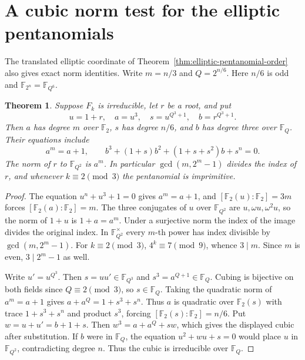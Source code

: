 \documentclass[11pt]{article}
\newtheorem{theorem}{Theorem}
\newcommand{\F}{\mathbb F_2}
\begin{document}
\section{A cubic norm test for the elliptic pentanomials}
\label{sec:elliptic-cubic-norm}
The translated elliptic coordinate of Theorem~\ref{thm:elliptic-pentanomial-order}
also gives exact norm identities. Write \(m=n/3\) and \(Q=2^{n/6}\).
Here \(n/6\) is odd and \(\mathbb F_{2^n}=\mathbb F_{Q^6}\).
\begin{theorem}\label{thm:elliptic-cubic-norm}
Suppose \(F_k\) is irreducible, let \(r\) be a root, and put
\[
 u=1+r,\quad a=u^3,\quad s=u^{Q^3+1},\quad b=r^{Q^3+1}.
\]
Then \(a\) has degree \(m\) over \(\F\), \(s\) has degree \(n/6\),
and \(b\) has degree three over \(\mathbb F_Q\). Their equations include
\[
 a^m=a+1,\qquad
 b^3+(1+s)b^2+(1+s+s^2)b+s^n=0.
\]
The norm of \(r\) to \(\mathbb F_{Q^2}\) is \(a^m\). In particular
\(\gcd(m,2^m-1)\) divides the index of \(r\), and whenever
\(k\equiv2\pmod3\) the pentanomial is imprimitive.
\end{theorem}
\begin{proof}
The equation \(u^n+u^3+1=0\) gives \(a^m=a+1\), and
\([\F(u):\F]=3m\) forces \([\F(a):\F]=m\).
The three conjugates of \(u\) over \(\mathbb F_{Q^2}\) are
\(u,\omega u,\omega^2u\), so the norm of \(1+u\) is \(1+a=a^m\).
Under a surjective norm the index of the image divides the original
index. In \(\mathbb F_{Q^2}^\times\) every \(m\)-th power has index
divisible by \(\gcd(m,2^m-1)\). For \(k\equiv2\pmod3\),
\(4^k\equiv7\pmod9\), whence \(3\mid m\). Since \(m\) is even,
\(3\mid 2^m-1\) as well.

Write \(u'=u^{Q^3}\). Then \(s=uu'\in\mathbb F_{Q^3}\) and
\(s^3=a^{Q+1}\in\mathbb F_Q\). Cubing is bijective on both fields
since \(Q\equiv2\pmod3\), so \(s\in\mathbb F_Q\).
Taking the quadratic norm of \(a^m=a+1\) gives
\(a+a^Q=1+s^3+s^n\). Thus \(a\) is quadratic over \(\F(s)\) with
trace \(1+s^3+s^n\) and product \(s^3\), forcing
\([\F(s):\F]=n/6\). Put \(w=u+u'=b+1+s\). Then
\(w^3=a+a^Q+sw\), which gives the displayed cubic after
substitution. If \(b\) were in \(\mathbb F_Q\), the equation
\(u^2+wu+s=0\) would place \(u\) in \(\mathbb F_{Q^2}\), contradicting
degree \(n\). Thus the cubic is irreducible over \(\mathbb F_Q\).
\end{proof}
\end{document}
